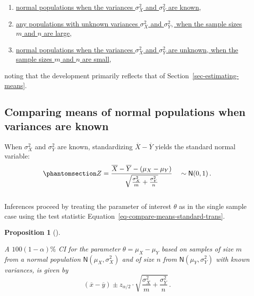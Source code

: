 \documentclass[
  a4paper,
  DIV=11,
  numbers=noendperiod,
  oneside]{scrreprt}
\providecommand{\tightlist}{%
  \setlength{\itemsep}{0pt}\setlength{\parskip}{0pt}}
\theoremstyle{definition}
\theoremstyle{definition}
\theoremstyle{plain}
\newtheorem{proposition}{Proposition}[chapter]
\theoremstyle{plain}
\theoremstyle{definition}
\theoremstyle{remark}
\begin{document}
\begin{enumerate}
\def\labelenumi{\arabic{enumi}.}
\tightlist
\item
  \hyperref[sec-compare-means-normpops-vars-known]{normal populations
  when the variances \(\sigma_X^2\) and \(\sigma_Y^2\) are known},
\item
  \hyperref[sec-compare-means-large-samples]{any populations with
  unknown variances \(\sigma_X^2\) and \(\sigma_Y^2,\) when the sample
  sizes \(m\) and \(n\) are large},
\item
  \hyperref[sec-compare-means-normpops-vars-unknown]{normal populations
  when the variances \(\sigma_X^2\) and \(\sigma_Y^2\) are unknown, when
  the sample sizes \(m\) and \(n\) are small},
\end{enumerate}

noting that the development primarily reflects that of
Section~\ref{sec-estimating-means}.

\subsection{Comparing means of normal populations when variances are
known}\label{sec-compare-means-normpops-vars-known}

When \(\sigma_X^2\) and \(\sigma_Y^2\) are known, standardizing
\(\overline{X} - \overline{Y}\) yields the standard normal variable:
\begin{equation}\phantomsection\label{eq-compare-means-standard-trans}{
 Z = \frac{\overline{X} - \overline{Y} - (\mu_X - \mu_Y)}{\sqrt{\frac{\sigma_X^2}{m} + \frac{\sigma_Y^2}{n}}}\quad \sim \mathsf{N}(0,1)\,.
}\end{equation}\\
Inferences proceed by treating the parameter of interest \(\theta\) as
in the single sample case using the test statistic
Equation~\ref{eq-compare-means-standard-trans}.

\begin{proposition}[]\protect\hypertarget{prp-ci-compare-means-normpops-vars-known}{}\label{prp-ci-compare-means-normpops-vars-known}

A \(100(1-\alpha)\%\) CI for the parameter \(\theta = \mu_X - \mu_Y\)
based on samples of size \(m\) from a normal population
\(\mathsf{N}(\mu_X, \sigma_X^2)\) and of size \(n\) from
\(\mathsf{N}(\mu_Y, \sigma_Y^2)\) with known variances, is given by \[
 (\overline{x} - \overline{y}) \pm z_{\alpha/2} 
 \cdot \sqrt{\frac{\sigma_X^2}{m} + \frac{\sigma_Y^2}{n}} \,.
\]

\end{proposition}
\end{document}
